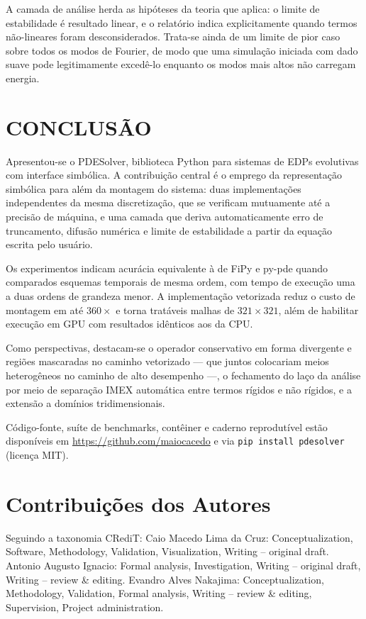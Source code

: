 \documentclass[10pt,brazil,english]{article}
\begin{document}
A camada de análise herda as hipóteses da teoria que aplica: o limite de estabilidade é resultado linear, e o relatório indica explicitamente quando termos não-lineares foram desconsiderados. Trata-se ainda de um limite de pior caso sobre todos os modos de Fourier, de modo que uma simulação iniciada com dado suave pode legitimamente excedê-lo enquanto os modos mais altos não carregam energia.

\section{CONCLUSÃO}

Apresentou-se o PDESolver, biblioteca Python para sistemas de EDPs evolutivas com interface simbólica. A contribuição central é o emprego da representação simbólica para além da montagem do sistema: duas implementações independentes da mesma discretização, que se verificam mutuamente até a precisão de máquina, e uma camada que deriva automaticamente erro de truncamento, difusão numérica e limite de estabilidade a partir da equação escrita pelo usuário.

Os experimentos indicam acurácia equivalente à de FiPy e py-pde quando comparados esquemas temporais de mesma ordem, com tempo de execução uma a duas ordens de grandeza menor. A implementação vetorizada reduz o custo de montagem em até $360\times$ e torna tratáveis malhas de $321\times321$, além de habilitar execução em GPU com resultados idênticos aos da CPU.

Como perspectivas, destacam-se o operador conservativo em forma divergente e regiões mascaradas no caminho vetorizado --- que juntos colocariam meios heterogêneos no caminho de alto desempenho ---, o fechamento do laço da análise por meio de separação IMEX automática entre termos rígidos e não rígidos, e a extensão a domínios tridimensionais.

Código-fonte, suíte de benchmarks, contêiner e caderno reprodutível estão disponíveis em \url{https://github.com/maiocacedo} e via \texttt{pip install pdesolver} (licença MIT).

\section*{Contribuições dos Autores}
Seguindo a taxonomia CRediT: Caio Macedo Lima da Cruz: Conceptualization, Software, Methodology, Validation, Visualization, Writing -- original draft. Antonio Augusto Ignacio: Formal analysis, Investigation, Writing -- original draft, Writing -- review \& editing. Evandro Alves Nakajima: Conceptualization, Methodology, Validation, Formal analysis, Writing -- review \& editing, Supervision, Project administration.



\end{document}

